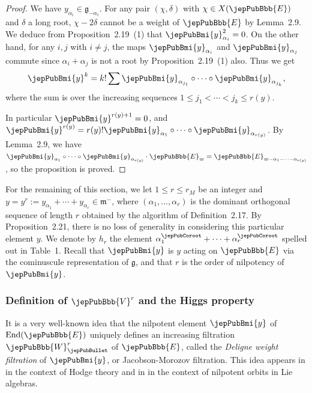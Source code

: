 \begin{proof}
We have $y_{\alpha_i}\in\mathfrak g_{-\alpha_i}$. For any pair $(\chi,\delta)$ with $\chi\in X(\jepPubBbb{E})$ and $\delta$ a long root, $\chi-2\delta$ cannot be a weight of $\jepPubBbb{E}$ by Lemma~2.9. We deduce from Proposition~2.19~(1) that $\jepPubBmi{y}_{\alpha_i}^2=0$. On the other hand, for any $i,j$ with $i\neq j$, the maps $\jepPubBmi{y}_{\alpha_i}$ and $\jepPubBmi{y}_{\alpha_j}$ commute since $\alpha_i+\alpha_j$ is not a root by Proposition~2.19~(1) also. Thus we get
\[
\jepPubBmi{y}^k=k!\sum\jepPubBmi{y}_{\alpha_{j_1}}\circ\cdots\circ\jepPubBmi{y}_{\alpha_{j_k}},
\]
where the sum is over the increasing sequences $1\leqslant j_1<\cdots<j_k\leqslant r(y)$.

In particular $\jepPubBmi{y}^{r(y)+1}=0$, and $\jepPubBmi{y}^{r(y)}=r(y)!\jepPubBmi{y}_{\alpha_1}\circ\cdots\circ\jepPubBmi{y}_{\alpha_{r(y)}}$. By Lemma~2.9, we have $\jepPubBmi{y}_{\alpha_1}\circ\cdots\circ\jepPubBmi{y}_{\alpha_{r(y)}}\cdot\jepPubBbb{E}_\varpi=\jepPubBbb{E}_{\varpi-\alpha_1-\cdots-\alpha_{r(y)}}$, so the proposition is proved.
\end{proof}
For the remaining of this section, we let $1\leqslant r\leqslant r_M$ be an integer and $y=y^r:=y_{\alpha_1}+\cdots+y_{\alpha_r}\in\mathfrak m^-$, where $(\alpha_1,\ldots,\alpha_r)$ is the dominant orthogonal sequence of length $r$ obtained by the algorithm of Definition~2.17. By Proposition~2.21, there is no loss of generality in considering this particular element $y$. We denote by $h_r$ the element $\alpha_1^\jepPubCoroot+\cdots+\alpha_r^\jepPubCoroot$ spelled out in Table~1. Recall that $\jepPubBmi{y}$ is $y$ acting on $\jepPubBbb{E}$ via the cominuscule representation of $\mathfrak g$, and that $r$ is the order of nilpotency of $\jepPubBmi{y}$.
\subsubsection{Definition of $\jepPubBbb{V}^r$ and the Higgs property}
It is a very well-known idea that the nilpotent element $\jepPubBmi{y}$ of $\operatorname{End}(\jepPubBbb{E})$ uniquely defines an increasing filtration $\jepPubBbb{W}^r_\jepPubBullet$ of $\jepPubBbb{E}$, called the \emph{Deligne weight filtration} of $\jepPubBmi{y}$, or Jacobson-Morozov filtration. This idea appears in \cite[\S1.6.13]{jep93Del80} in the context of Hodge theory and in \cite[\S\S3.2 \& 3.4]{jep93McG02} in the context of nilpotent orbits in Lie algebras.

